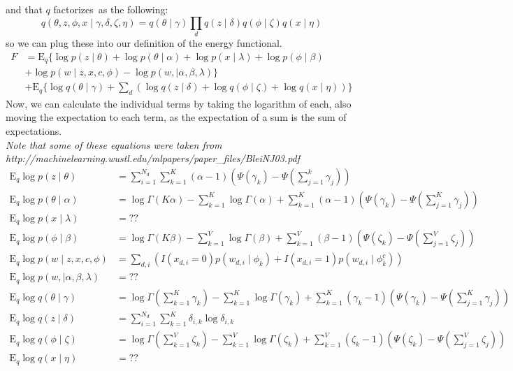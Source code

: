 \documentclass[12pt]{article}
\begin{document}
and that $q$ factorizes\ as the following:
\begin{equation*}
q(\theta, z, \phi, x \mid \gamma, \delta, \zeta, \eta) = q(\theta \mid \gamma) \prod_d q(z \mid \delta) q(\phi \mid \zeta) q(x \mid \eta)
\end{equation*}
so we can plug these into our definition of the energy functional.
\begin{align*}
F &= \mathrm{E}_q \{\log p(z \mid \theta) + \log p(\theta \mid \alpha) + \log p(x \mid \lambda) + \log p(\phi \mid \beta) \\
&+ \log p(w \mid z, x, c, \phi) - \log p(w, \mid \alpha, \beta, \lambda) \} \\
&+ \mathrm{E}_q \{ \log q(\theta \mid \gamma) + \sum_d \left( \log q(z \mid \delta) + \log q(\phi \mid \zeta) + \log q(x \mid \eta) \right) \} 
\end{align*}
Now, we can calculate the individual terms by taking the logarithm of each, also moving the expectation to each term, as the expectation of a sum is the sum of expectations.\\
\noindent \textit{Note that some of these equations were taken from\\ http://machinelearning.wustl.edu/mlpapers/paper\_files/BleiNJ03.pdf }
\begin{align*}
\mathrm{E}_q \log p(z \mid \theta) &= \sum\limits_{i=1}^{N_d} \sum\limits_{k=1}^K (\alpha - 1)(\Psi(\gamma_k) - \Psi(\sum_{j=1}^k \gamma_j) ) \\
\mathrm{E}_q\log p(\theta \mid \alpha) &= \log \Gamma (K \alpha) - \sum\limits_{k=1}^K \log \Gamma(\alpha) + \sum\limits_{k=1}^K (\alpha - 1)(\Psi(\gamma_k) - \Psi(\sum_{j=1}^K \gamma_j) )\\
\mathrm{E}_q\log p(x \mid \lambda) &= ??\\
\mathrm{E}_q\log p(\phi \mid \beta) &= \log \Gamma (K \beta) - \sum\limits_{k=1}^V \log \Gamma(\beta) + \sum\limits_{k=1}^V (\beta - 1)(\Psi(\zeta_k) - \Psi(\sum_{j=1}^V \zeta_j) )\\
\mathrm{E}_q\log p(w \mid z, x, c, \phi) &= \sum_{d,i} \left( I(x_{d,i} = 0) p(w_{d,i} \mid \phi_k) + I(x_{d,i} = 1) p(w_{d,i} \mid \phi_{k}^{c})  \right)\\
\mathrm{E}_q\log p(w, \mid \alpha, \beta, \lambda) &= ??\\
\mathrm{E}_q\log q(\theta \mid \gamma) &= \log \Gamma (\sum\limits_{k=1}^K \gamma_k) - \sum\limits_{k=1}^K \log \Gamma(\gamma_k) + \sum\limits_{k=1}^K (\gamma_k - 1)(\Psi(\gamma_k) - \Psi(\sum_{j=1}^K \gamma_j) )\\
\mathrm{E}_q\log q(z \mid \delta) &= \sum\limits_{i=1}^{N_d} \sum\limits_{k=1}^K \delta_{i,k} \log \delta_{i,k} \\
\mathrm{E}_q\log q(\phi \mid \zeta) &= \log \Gamma (\sum\limits_{k=1}^V \zeta_k) - \sum\limits_{k=1}^V \log \Gamma(\zeta_k) + \sum\limits_{k=1}^V (\zeta_k - 1)(\Psi(\zeta_k) - \Psi(\sum_{j=1}^V \zeta_j) )\\
\mathrm{E}_q\log q(x \mid \eta) &= ??\\
\end{align*}

\end{document}
